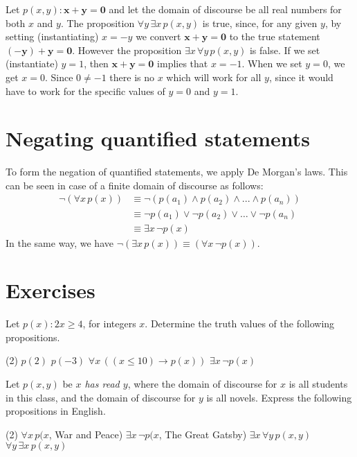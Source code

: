 \begin{exmp}
Let $p(x,y): \mathbf{x+y=0}$ and let the domain of discourse be all real numbers for 
both $x$ and $y$. The proposition $\forall y\,\exists x\, p(x,y)$ is true, since, for any given $y$, by setting (instantiating) $x=-y$ we convert $\mathbf{x+y=0}$ to the true statement
$\mathbf{(-y)+y=0}$. However the proposition $\exists x\, \forall y\, p(x,y)$ is false. If we set (instantiate) $y=1$, then
$\mathbf{x+y=0}$ implies that $x=-1$. When we set $y=0$, we get $x=0$. Since $0\neq -1$ there is no $x$
which will work for all $y$, since it would have to work for the specific values of $y=0$ and $y=1$.
\end{exmp}

\section{Negating quantified statements}
To form the negation of  quantified statements, we apply De Morgan's laws. This can be seen in 
case of a finite domain of discourse as follows:
\begin{align*}
\lnot (\forall x\, p(x))&\equiv\lnot (p(a_1)\wedge p(a_2) \wedge ... \wedge p(a_n))\\
&\equiv \lnot p(a_1)\lor\lnot p(a_2) \lor \dots \lor\lnot p(a_n)\\
&\equiv \exists x\, \lnot p(x)
\end{align*}
In the same way, we have $\lnot (\exists x\, p(x)) \equiv (\forall x\, \lnot p(x))$.


\clearpage
\section{Exercises}
\begin{exer}
Let $p(x): 2x\geq 4$, for integers $x$. Determine the truth values of the following propositions. 
\begin{tasks}(2)
	\task $p(2)$
	\task $p(-3)$
	\task $\forall x\, ((x\leq 10)\to p(x))$
	\task $\exists x\, \lnot p(x)$
\end{tasks}
\end{exer}

\begin{exer}\label{ex:quant->eng}
Let $p(x,y)$ be {\itshape $x$ has read $y$}, where the domain of discourse for 
$x$ is all students
in this class, and the domain of discourse for $y$ is all novels. Express the
following propositions in English. 
\begin{tasks}(2)
	\task $\forall x\, p(x$, War and Peace)
	\task $\exists x\, \lnot p(x$, The Great Gatsby)
	\task $\exists x\, \forall y\, p(x,y)$
	\task $\forall y\, \exists x\, p(x,y)$
\end{tasks}

\end{exer}

